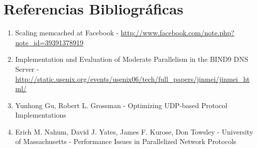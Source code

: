 \documentclass[12pt,spanish,letterpaper]{article}
\begin{document}
\section{Referencias Bibliográficas}
\begin{enumerate}
	\item Scaling memcached at Facebook - \url{http://www.facebook.com/note.php?note\_id=39391378919} \label{paper1}
	\item Implementation and Evaluation of Moderate Parallelism in the BIND9 DNS Server - \url{http://static.usenix.org/events/usenix06/tech/full\_papers/jinmei/jinmei\_html/}\label{paper2}
	\item Yunhong Gu, Robert L. Grossman - Optimizing UDP-based Protocol Implementations\label{paper3}
	\item Erich M. Nahum, David J. Yates, James F. Kurose, Don Towsley - University of Massachusetts - Performance Issues in Parallelized Network Protocols\label{paper4}
\end{enumerate}
\end{document}
